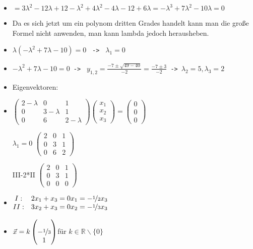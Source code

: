 \documentclass{article}
\newcommand{\R}{\mathbb{R}}
\begin{document}
\begin{itemize}
\begin{itemize}
\begin{itemize}
				\item{$=3\lambda^2-12\lambda+12-\lambda^2+4\lambda^2-4\lambda-12+6\lambda=-\lambda^3+7\lambda^2-10\lambda=0$}
				\item{Da es sich jetzt um ein polynom dritten Grades handelt kann man die große Formel nicht anwenden, man kann lambda jedoch herausheben.}
				\item{$\lambda(-\lambda^2+7\lambda-10)=0$ \texttt{ -> } $\lambda_1=0$}
				\item{$-\lambda^2+7\lambda-10=0$\texttt{ -> } $y_{1,2}=\frac{-7\pm\sqrt{49-40}}{-2}=\frac{-7\pm3}{-2}$\texttt{ -> }$\lambda_2=5, \lambda_3=2$}
				\item{Eigenvektoren:}
				\item{$\begin{pmatrix} 2-\lambda & 0 & 1 \\ 0 & 3-\lambda & 1 \\ 0 & 6 & 2-\lambda \end{pmatrix}\begin{pmatrix} x_1 \\ x_2 \\ x_3 \end{pmatrix}=\begin{pmatrix} 0 \\ 0 \\ 0 \end{pmatrix}$}
				\item[$\lambda_1=0$]{$\begin{pmatrix} 2 & 0 & 1 \\ 0 & 3 & 1 \\ 0 & 6 & 2 \end{pmatrix}$}
				\item[III-2*II]{$\begin{pmatrix} 2 & 0 & 1 \\ 0 & 3 & 1 \\ 0 & 0 & 0 \end{pmatrix}$}
				\item{$\begin{matrix} I: & 2x_1+x_3=0 \\ II: & 3x_2+x_3=0 \end{matrix}\begin{matrix} x_1=-\nicefrac{1}{2}x_3 \\ x_2=-\nicefrac{1}{3}x_3\end{matrix}$}
				\item{$\vec{x}=k \begin{pmatrix}  \\ -\nicefrac{1}{3} \\ 1 \end{pmatrix}$für $k\in\R\backslash\{0\}$}

\end{itemize}
\end{itemize}
\end{itemize}
\end{document}
